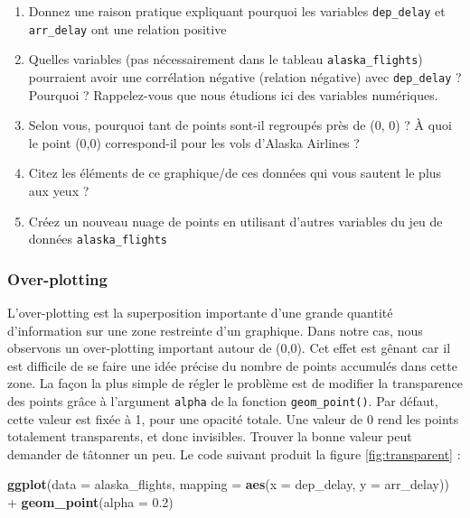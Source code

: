 \documentclass[a4paperpaper,]{article}
\newenvironment{Shaded}{\begin{snugshade}}{\end{snugshade}}
\newcommand{\DataTypeTok}[1]{\textcolor[rgb]{0.00,0.34,0.68}{#1}}
\newcommand{\FloatTok}[1]{\textcolor[rgb]{0.69,0.50,0.00}{#1}}
\newcommand{\KeywordTok}[1]{\textcolor[rgb]{0.12,0.11,0.11}{\textbf{#1}}}
\newcommand{\NormalTok}[1]{\textcolor[rgb]{0.12,0.11,0.11}{#1}}
\newcommand{\OperatorTok}[1]{\textcolor[rgb]{0.12,0.11,0.11}{#1}}
\newcommand{\StringTok}[1]{\textcolor[rgb]{0.75,0.01,0.01}{#1}}
\providecommand{\tightlist}{%
  \setlength{\itemsep}{0pt}\setlength{\parskip}{0pt}}
\begin{document}
\begin{enumerate}
\def\labelenumi{\arabic{enumi}.}
\tightlist
\item
  Donnez une raison pratique expliquant pourquoi les variables \texttt{dep\_delay} et \texttt{arr\_delay} ont une relation positive
\item
  Quelles variables (pas nécessairement dans le tableau \texttt{alaska\_flights}) pourraient avoir une corrélation négative (relation négative) avec \texttt{dep\_delay} ? Pourquoi ? Rappelez-vous que nous étudions ici des variables numériques.
\item
  Selon vous, pourquoi tant de points sont-il regroupés près de (0, 0) ? À quoi le point (0,0) correspond-il pour les vols d'Alaska Airlines ?
\item
  Citez les éléments de ce graphique/de ces données qui vous sautent le plus aux yeux ?
\item
  Créez un nouveau nuage de points en utilisant d'autres variables du jeu de données \texttt{alaska\_flights}
\end{enumerate}

\hypertarget{over-plotting}{%
\subsubsection{Over-plotting}\label{over-plotting}}

L'over-plotting est la superposition importante d'une grande quantité d'information sur une zone restreinte d'un graphique. Dans notre cas, nous observons un over-plotting important autour de (0,0). Cet effet est gênant car il est difficile de se faire une idée précise du nombre de points accumulés dans cette zone. La façon la plus simple de régler le problème est de modifier la transparence des points grâce à l'argument \texttt{alpha} de la fonction \texttt{geom\_point()}. Par défaut, cette valeur est fixée à 1, pour une opacité totale. Une valeur de 0 rend les points totalement transparents, et donc invisibles. Trouver la bonne valeur peut demander de tâtonner un peu. Le code suivant produit la figure \ref{fig:transparent} :

\begin{Shaded}
\begin{Highlighting}[]
\KeywordTok{ggplot}\NormalTok{(}\DataTypeTok{data =}\NormalTok{ alaska_flights, }\DataTypeTok{mapping =} \KeywordTok{aes}\NormalTok{(}\DataTypeTok{x =}\NormalTok{ dep_delay, }\DataTypeTok{y =}\NormalTok{ arr_delay)) }\OperatorTok{+}\StringTok{ }
\StringTok{  }\KeywordTok{geom_point}\NormalTok{(}\DataTypeTok{alpha =} \FloatTok{0.2}\NormalTok{)}
\end{Highlighting}
\end{Shaded}
\end{document}
